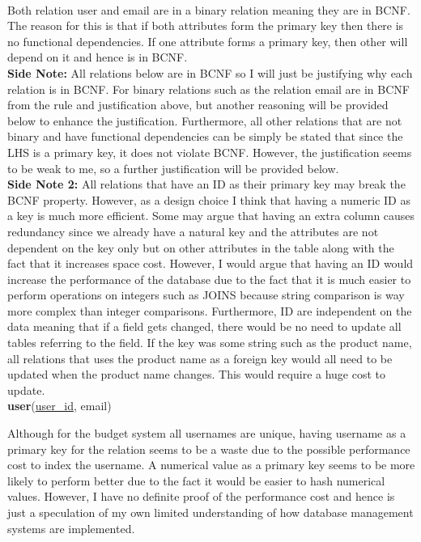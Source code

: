 \documentclass{article}
\begin{document}
\\
Both relation user and email are in a binary relation meaning they are in BCNF. The reason for this is that if both attributes form the primary key then there is no functional dependencies. If one attribute forms a primary key, then other will depend on it and hence is in BCNF.
\\

\textbf{Side Note:} All relations below are in BCNF so I will just be justifying why each relation is in BCNF. For binary relations such as the relation email are in BCNF from the rule and justification above, but another reasoning will be provided below to enhance the justification. Furthermore, all other relations that are not binary and have functional dependencies can be simply be stated that since the LHS is a primary key, it does not violate BCNF. However, the justification seems to be weak to me, so a further justification will be provided below.
\\

\textbf{Side Note 2:} All relations that have an ID as their primary key may break the BCNF property. However, as a design choice I think that having a numeric ID as a key is much more efficient. Some may argue that having an extra column causes redundancy since we already have a natural key and the attributes are not dependent on the key only but on other attributes in the table along with the fact that it increases space cost. However, I would argue that having an ID would increase the performance of the database due to the fact that it is much easier to perform operations on integers such as JOINS because string comparison is way more complex than integer comparisons. Furthermore, ID are independent on the data meaning that if a field gets changed, there would be no need to update all tables referring to the field. If the key was some string such as the product name, all relations that uses the product name as a foreign key would all need to be updated when the product name changes. This would require a huge cost to update.  
\\

\textbf{user}(\underline{user\_id}, email)

Although for the budget system all usernames are unique, having username as a primary key for the relation seems to be a waste due to the possible performance cost to index the username. A numerical value as a primary key seems to be more likely to perform better due to the fact it would be easier to hash numerical values. However, I have no definite proof of the performance cost and hence is just a speculation of my own limited understanding of how database management systems are implemented.
\end{document}
